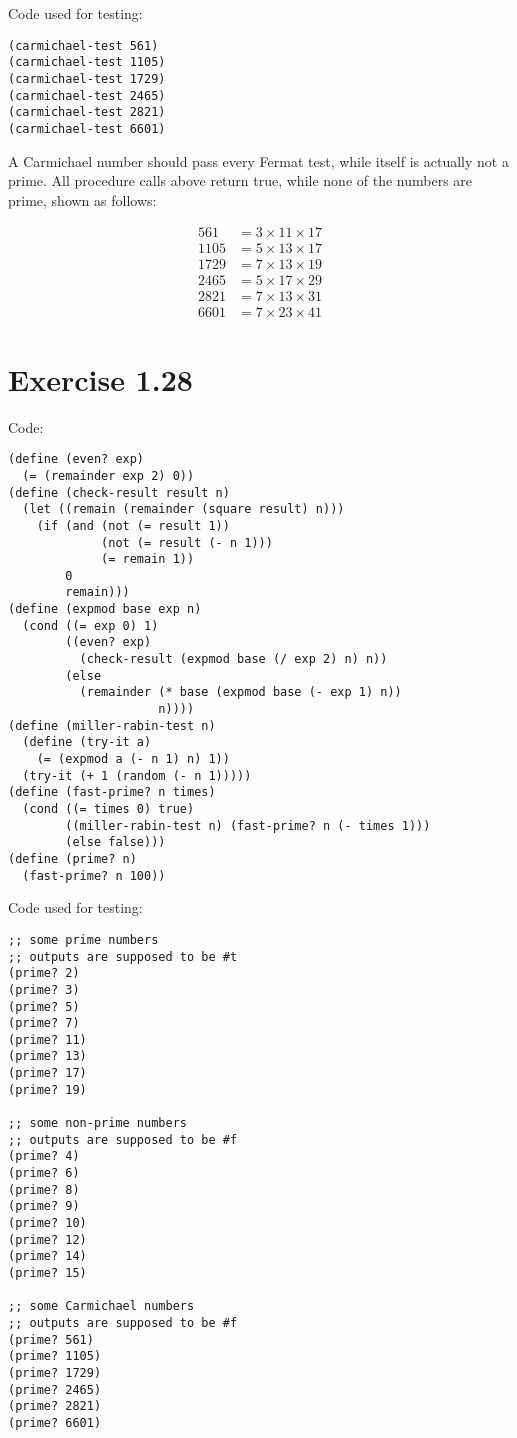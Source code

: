 \documentclass[../main.tex]{subfiles}
\begin{document}
Code used for testing:

\begin{lstlisting}
(carmichael-test 561)
(carmichael-test 1105)
(carmichael-test 1729)
(carmichael-test 2465)
(carmichael-test 2821)
(carmichael-test 6601)
\end{lstlisting}

A Carmichael number should pass every Fermat test, while
 itself is actually not a prime. All procedure calls above
 return true, while none of the numbers are prime, shown
 as follows:

\begin{align*}
561 &= 3 \times 11 \times 17 \\
1105 &= 5 \times 13 \times 17 \\
1729 &= 7 \times 13 \times 19 \\
2465 &= 5 \times 17 \times 29 \\
2821 &= 7 \times 13 \times 31 \\
6601 &= 7 \times 23 \times 41
\end{align*}

\section{Exercise 1.28}

Code:

\begin{lstlisting}
(define (even? exp)
  (= (remainder exp 2) 0))
(define (check-result result n)
  (let ((remain (remainder (square result) n)))
    (if (and (not (= result 1))
             (not (= result (- n 1)))
             (= remain 1))
        0
        remain)))
(define (expmod base exp n)
  (cond ((= exp 0) 1)
        ((even? exp)
          (check-result (expmod base (/ exp 2) n) n))
        (else
          (remainder (* base (expmod base (- exp 1) n))
                     n))))
(define (miller-rabin-test n)
  (define (try-it a)
    (= (expmod a (- n 1) n) 1))
  (try-it (+ 1 (random (- n 1)))))
(define (fast-prime? n times)
  (cond ((= times 0) true)
        ((miller-rabin-test n) (fast-prime? n (- times 1)))
        (else false)))
(define (prime? n)
  (fast-prime? n 100))
\end{lstlisting}

Code used for testing:

\begin{lstlisting}
;; some prime numbers
;; outputs are supposed to be #t
(prime? 2)
(prime? 3)
(prime? 5)
(prime? 7)
(prime? 11)
(prime? 13)
(prime? 17)
(prime? 19)

;; some non-prime numbers
;; outputs are supposed to be #f
(prime? 4)
(prime? 6)
(prime? 8)
(prime? 9)
(prime? 10)
(prime? 12)
(prime? 14)
(prime? 15)

;; some Carmichael numbers
;; outputs are supposed to be #f
(prime? 561)
(prime? 1105)
(prime? 1729)
(prime? 2465)
(prime? 2821)
(prime? 6601)
\end{lstlisting}
\end{document}
